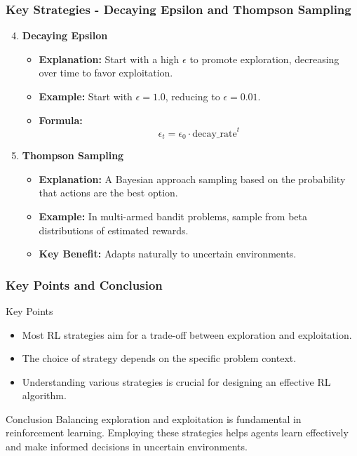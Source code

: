 \documentclass[aspectratio=169]{beamer}
\begin{document}
\begin{frame}[fragile]
    \frametitle{Key Strategies - Decaying Epsilon and Thompson Sampling}
    \begin{enumerate}
        \setcounter{enumi}{3}
        \item \textbf{Decaying Epsilon}
        \begin{itemize}
            \item \textbf{Explanation:} Start with a high $\epsilon$ to promote exploration, decreasing over time to favor exploitation.
            \item \textbf{Example:} Start with $\epsilon = 1.0$, reducing to $\epsilon = 0.01$.
            \item \textbf{Formula:}
            \begin{equation}
                \epsilon_t = \epsilon_0 \cdot \text{decay\_rate}^t
            \end{equation}
        \end{itemize}

        \item \textbf{Thompson Sampling}
        \begin{itemize}
            \item \textbf{Explanation:} A Bayesian approach sampling based on the probability that actions are the best option.
            \item \textbf{Example:} In multi-armed bandit problems, sample from beta distributions of estimated rewards.
            \item \textbf{Key Benefit:} Adapts naturally to uncertain environments.
        \end{itemize}
    \end{enumerate}
\end{frame}

\begin{frame}[fragile]
    \frametitle{Key Points and Conclusion}
    \begin{block}{Key Points}
        \begin{itemize}
            \item Most RL strategies aim for a trade-off between exploration and exploitation.
            \item The choice of strategy depends on the specific problem context.
            \item Understanding various strategies is crucial for designing an effective RL algorithm.
        \end{itemize}
    \end{block}

    \begin{block}{Conclusion}
        Balancing exploration and exploitation is fundamental in reinforcement learning. 
        Employing these strategies helps agents learn effectively and make informed decisions in uncertain environments.
    \end{block}
\end{frame}
\end{document}
